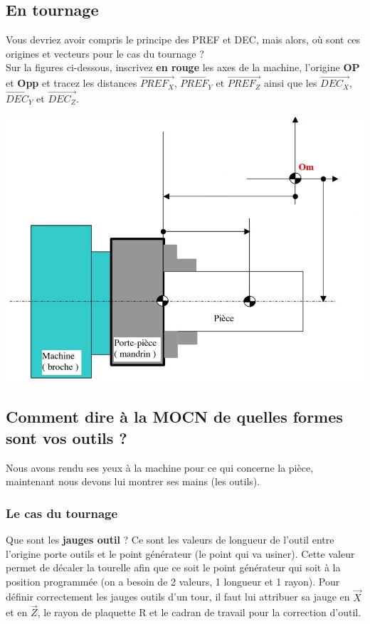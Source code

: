 \documentclass[12pt]{article}
\newcounter{exo}
\newenvironment{exo}{\stepcounter{exo}\vspace{0.5cm}{\bfseries Question \theexo\ :}}{\par\vspace{0.5cm}}
\begin{document}
\subsection*{En tournage}
Vous devriez avoir compris le principe des PREF et DEC, mais alors, où sont ces origines et vecteurs pour le cas du tournage ?\\
\begin{exo}\label{exo1} Sur la figures ci-dessous, inscrivez \textbf{en rouge} les axes de la machine, l'origine \textbf{OP} et \textbf{Opp} et tracez les distances $\overrightarrow{PREF_X}$, $\overrightarrow{PREF_Y}$ et $\overrightarrow{PREF_Z}$ ainsi que les $\overrightarrow{DEC_X}$, $\overrightarrow{DEC_Y}$ et $\overrightarrow{DEC_Z}$.\end{exo}
\begin{center}
\includegraphics[width=0.9\linewidth]{PREFDEC1.JPG}
\end{center}


\subsection{Comment dire à la MOCN de quelles formes sont vos outils ?}
\begin{tcolorbox}[colback=blue!5!white,colframe=red!75!black]
  \bcinfo Nous avons rendu ses yeux à la machine pour ce qui concerne la pièce, maintenant nous devons lui montrer ses mains (les outils).
\end{tcolorbox}

\subsubsection{Le cas du tournage}
Que sont les \textbf{jauges outil} ? Ce sont les valeurs de longueur de l’outil entre l’origine porte outils et le point générateur (le point qui va usiner). Cette valeur permet de décaler la tourelle afin que ce soit le point générateur qui soit à la position programmée (on a besoin de 2 valeurs, 1 longueur et 1 rayon). Pour définir correctement les jauges outils d’un tour, il faut lui attribuer sa jauge en $\vec{X}$ et en $\vec{Z}$, le
rayon de plaquette R et le cadran de travail pour la correction d’outil.
\end{document}
